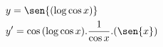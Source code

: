 \begin{ex}
\begin{align}
&y=\sen{(\log{\cos{x}})}\nonumber\\
&y'=\cos{(\log{\cos{x}})}.\frac{1}{\cos{x}}.(\sen{x})\nonumber
\end{align}
\end{ex}